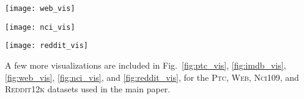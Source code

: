 \documentclass{article}
\newcommand{\ptc}{\textsc{Ptc}\xspace}
\newcommand{\web}{\textsc{Web}\xspace}
\newcommand{\nci}{\textsc{Nci109}\xspace}
\newcommand{\reddit}{\textsc{Reddit12k}\xspace}
\begin{document}
\begin{figure*}
\centering
\texttt{[image: web\_vis]}
\caption{Visualization of the \web dataset.}
\label{fig:web_vis}
\vspace*{-2mm}
\end{figure*}

\begin{figure*}
\centering
\texttt{[image: nci\_vis]}
\caption{Visualization of the \nci dataset.}
\label{fig:nci_vis}
\vspace*{-2mm}
\end{figure*}

\begin{figure*}
\centering
\texttt{[image: reddit\_vis]}
\caption{Visualization of the \reddit dataset.}
\label{fig:reddit_vis}
\vspace*{-2mm}
\end{figure*}


A few more visualizations are included in Fig.~\ref{fig:ptc_vis}, \ref{fig:imdb_vis}, \ref{fig:web_vis}, \ref{fig:nci_vis}, and \ref{fig:reddit_vis}, for the \ptc, \web, \nci, and \reddit datasets used in the main paper.


\label{sec-conc} 
\end{document}
